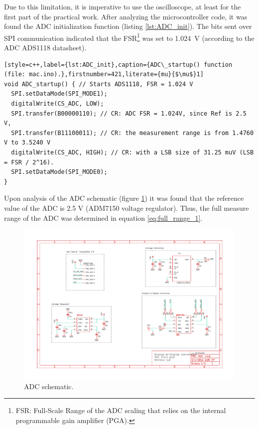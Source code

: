 \documentclass[a4paper,12pt]{article}
\begin{document}
Due to this limitation, it is imperative to use the oscilloscope, at least for the first part of the practical work. After analyzing the microcontroller code, it was found the ADC initialization function (listing \ref{lst:ADC_init}). The bits sent over SPI communication indicated that the FSR\footnote{FSR: Full-Scale Range of the ADC scaling that relies on the internal programmable gain amplifier (PGA).} was set to \mbox{1.024 V} (according to the ADC ADS1118 datasheet).
\begin{lstlisting}[style=c++,label={lst:ADC_init},caption={ADC\_startup() function (file: mac.ino).},firstnumber=421,literate={mu}{$\mu$}1]
void ADC_startup() { // Starts ADS1118, FSR = 1.024 V
  SPI.setDataMode(SPI_MODE1);
  digitalWrite(CS_ADC, LOW);
  SPI.transfer(B00000110); // CR: ADC FSR = 1.024V, since Ref is 2.5 V, 
  SPI.transfer(B11100011); // CR: the measurement range is from 1.4760 V to 3.5240 V
  digitalWrite(CS_ADC, HIGH); // CR: with a LSB size of 31.25 muV (LSB = FSR / 2^16).
  SPI.setDataMode(SPI_MODE0);
}
\end{lstlisting}

Upon analysis of the ADC schematic (figure \ref{fig:adc_sch}) it was found that the reference value of the ADC is 2.5 V (ADM7150 voltage regulator). Thus, the full measure range of the ADC was determined in equation \ref{eq:full_range_1}.
\begin{figure}[!h]
    \centering
    \includegraphics[width=\textwidth]{Images/MAC ADC v1.0.pdf}
    \captionsetup{justification=centering}
    \caption{ADC schematic.} 
    \label{fig:adc_sch}
\end{figure}
\end{document}
